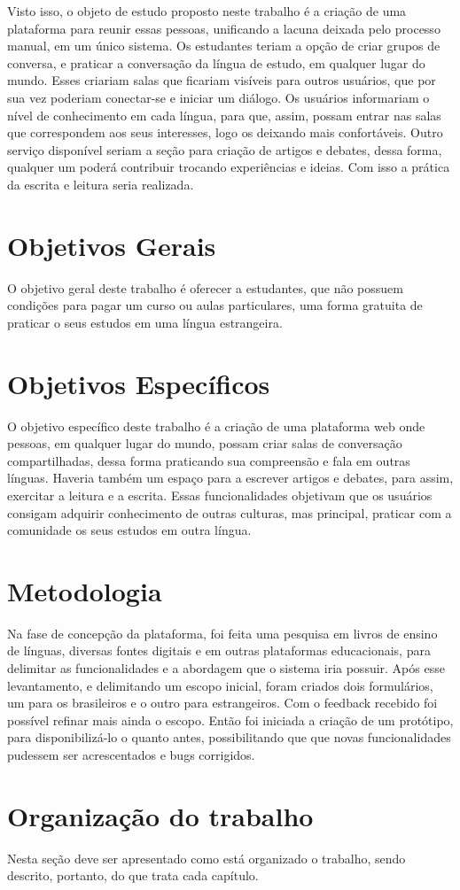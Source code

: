 Visto isso, o objeto de estudo proposto neste trabalho é a criação de uma plataforma para reunir essas pessoas, unificando a lacuna deixada pelo processo manual, em um único sistema. Os estudantes teriam a opção de criar grupos de conversa, e praticar a conversação da língua de estudo, em qualquer lugar do mundo. Esses criariam salas que ficariam visíveis para outros usuários, que por sua vez poderiam conectar-se e iniciar um diálogo. Os usuários informariam o nível de conhecimento em cada língua, para que, assim, possam entrar nas salas que correspondem aos seus interesses, logo os deixando mais confortáveis. Outro serviço disponível seriam a seção para criação de artigos e debates, dessa forma, qualquer um poderá contribuir trocando experiências e ideias. Com isso a prática da escrita e leitura seria realizada.



\section{Objetivos Gerais}

O objetivo geral deste trabalho é oferecer a estudantes, que não possuem condições para pagar um curso ou aulas particulares, uma forma gratuita de praticar o seus estudos em uma língua estrangeira.

\section{Objetivos Específicos}

O objetivo específico deste trabalho é a criação de uma plataforma web onde pessoas, em qualquer lugar do mundo, possam criar salas de conversação compartilhadas, dessa forma praticando sua compreensão e fala em outras línguas. Haveria também um espaço para a escrever artigos e debates, para assim, exercitar a leitura e a escrita. Essas funcionalidades objetivam que os usuários consigam adquirir conhecimento de outras culturas, mas principal, praticar com a comunidade os seus estudos em outra língua.

\section{Metodologia}

Na fase de concepção da plataforma, foi feita uma pesquisa em livros de ensino de línguas, diversas fontes digitais e em outras plataformas educacionais, para delimitar as funcionalidades e a abordagem que o sistema iria possuir. Após esse levantamento, e delimitando um escopo inicial, foram criados dois formulários, um para os brasileiros e o outro para estrangeiros. Com o feedback recebido foi possível refinar mais ainda o escopo. Então foi iniciada a criação de um protótipo, para disponibilizá-lo o quanto antes, possibilitando que que novas funcionalidades pudessem ser acrescentados e bugs corrigidos.

\section{Organização do trabalho}

Nesta seção deve ser apresentado como está organizado o trabalho, sendo
descrito, portanto, do que trata cada capítulo.
